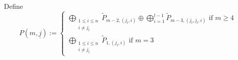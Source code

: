 \documentclass{amsart}
\newtheorem{lemma}[theorem]{Lemma}
\newcommand{\uj}{\underline j}
\newcommand{\Ext}{\operatorname{Ext}}
\begin{document}
\begin{comment}
\begin{lemma}
  \begin{enumerate}
    \item $\tilde P_m^{(i_1,\ldots,i_{n-1})}\cong\tilde P_{m-1}^{(i_n)}$
    \item The subrepresentation $\bigoplus_{i=1}^{k-1}\tilde P_{m-1,i}\oplus\bigoplus_{i=1}^k\tilde P_{m-2,i}\subset\bigoplus_{i=1}^k\tilde P_{m-1,i}$ is in $(\tilde P_m^{(k)})^\perp$ and
      \[\Ext(\bigoplus_{i=1}^k\tilde P_{m-1,i},\tilde P_m^{(k)})\cong\Ext(\tilde P_{m-1}^{(k)},\tilde P_m^{(k)}),\]
      where $\tilde P_{m-1}^{(k)}$ above denotes the cokernel of the inclusion.\footnote{do we need this? See also proof of Lemma 4.5}
  \end{enumerate}
\end{lemma}
\begin{proof}
The first statement follows for instance by induction when applying BGP-reflections.
\end{proof}
----TO HERE----DO NOT NEED THIS----
\end{comment}
Define 
$$P(m,\uj):=\begin{cases}\bigoplus_{\substack{1\leq i\leq n\\i\neq j_l}}\tilde P_{m-2,(j_l,i)}\oplus \bigoplus_{i=1}^{l-1}\tilde P_{m-3,(j_l,j_l,i)}\text{ if }m\geq 4\\\bigoplus_{\substack{1\leq i\leq n\\i\neq j_l}}\tilde P_{1,(j_l,i)}\text{ if }m=3\end{cases}$$
\end{document}
